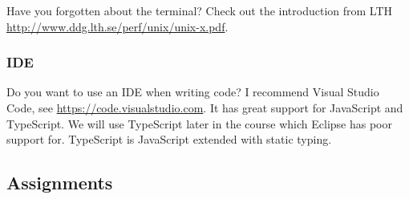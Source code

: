 \documentclass[fleqn, article, a4paper]{memoir}
\begin{document}
\noindent Have you forgotten about the terminal? Check out the introduction from LTH \url{http://www.ddg.lth.se/perf/unix/unix-x.pdf}.

\subsubsection*{IDE}

\noindent Do you want to use an IDE when writing code? I recommend Visual Studio Code, see \url{https://code.visualstudio.com}. It has great support for JavaScript and TypeScript. We will use TypeScript later in the course which Eclipse has poor support for. TypeScript is JavaScript extended with static typing.

\subsection*{Assignments}
\end{document}
